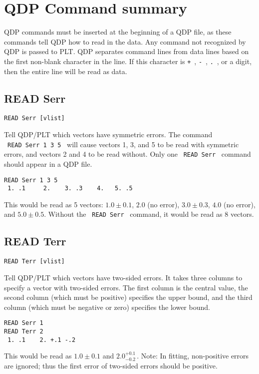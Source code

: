 \chapter{QDP Command summary}
\label{qdpcommands}

QDP commands must be inserted at the beginning of a QDP file,
as these commands tell QDP how to read in the data.
Any command not recognized by QDP is passed to PLT\@.
QDP separates command lines from data lines
based on the first non-blank character in the line.
If this character is {\tt +}\, , {\tt -}\, , {\tt .}\, , or a digit,
then the entire line will be read as data.

\section*{READ Serr}
\begin{verbatim}
READ Serr [vlist]
\end{verbatim}
Tell QDP/PLT which vectors have symmetric errors.
The command \ {\tt READ~Serr~1~3~5} \ will cause
vectors 1, 3, and 5 to be read with symmetric errors,
and vectors 2 and 4 to be read without.
Only one \ {\tt READ~Serr} \ command should appear in a QDP file.
 
\medskip
{}
\begin{verbatim}
READ Serr 1 3 5
 1. .1     2.    3. .3    4.   5. .5
\end{verbatim}
This would be read as 5 vectors:
$1.0\pm 0.1$, $2.0$ (no error), $3.0\pm 0.3$,
$4.0$ (no error), and $5.0\pm 0.5$.
Without the \ {\tt READ~Serr} \ command,
it would be read as 8 vectors.
 
\section*{READ Terr}
\begin{verbatim}
READ Terr [vlist]
\end{verbatim}
Tell QDP/PLT which vectors have two-sided errors.
It takes three columns to specify a vector with two-sided errors.
The first column is the central value,
the second column (which must be positive) specifies the upper bound,
and the third column (which must be negative or zero) specifies the lower bound.
 
\medskip
{}
\begin{verbatim}
READ Serr 1
READ Terr 2
 1. .1    2. +.1 -.2
\end{verbatim}
This would be read as $1.0\pm 0.1$ and $2.0^{+0.1}_{-0.2}\,$\@.
Note: In fitting, non-positive errors are ignored;
thus the first error of two-sided errors should be positive.
